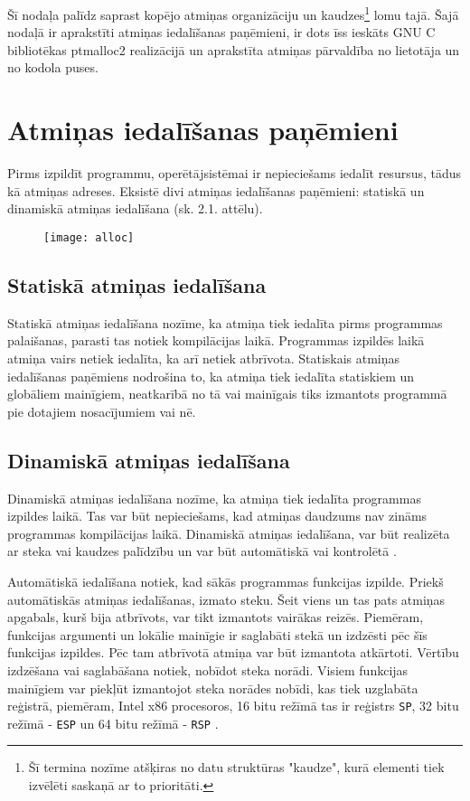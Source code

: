 ﻿Šī nodaļa palīdz saprast kopējo atmiņas organizāciju un kaudzes\footnote{Šī termina nozīme atšķiras no datu struktūras "kaudze", kurā elementi tiek izvēlēti saskaņā ar to prioritāti.} lomu tajā. 
Šajā nodaļā ir aprakstīti atmiņas iedalīšanas paņēmieni, ir dots īss ieskāts GNU C bibliotēkas ptmalloc2 realizācijā un aprakstīta atmiņas pārvaldība no lietotāja un no kodola puses.

\section{Atmiņas iedalīšanas paņēmieni}

Pirms izpildīt programmu, operētājsistēmai ir nepieciešams iedalīt resursus, tādus kā atmiņas adreses.  
Eksistē divi atmiņas iedalīšanas paņēmieni: statiskā un dinamiskā atmiņas iedalīšana (sk. 2.1. attēlu). 

\begin{figure}[h]
\begin{center}
\texttt{[image: alloc]}
\end{center}
\caption{\textbf{\fontsize{11}{12}\selectfont {Atmiņas iedalīšanas paņēmienu klasifikācija}}}
\label{fig:alloc}
\end{figure}


\subsection{Statiskā atmiņas iedalīšana}
Statiskā atmiņas iedalīšana nozīme, ka atmiņa tiek iedalīta pirms programmas palaišanas, parasti tas notiek kompilācijas laikā.
Programmas izpildēs laikā atmiņa vairs netiek iedalīta, ka arī netiek atbrīvota. 
Statiskais atmiņas iedalīšanas paņēmiens nodrošina to, ka atmiņa tiek iedalīta statiskiem un globāliem mainīgiem, neatkarībā no tā vai mainīgais tiks izmantots programmā pie dotajiem nosacījumiem vai nē.

\subsection{Dinamiskā atmiņas iedalīšana}
Dinamiskā atmiņas iedalīšana nozīme, ka atmiņa tiek iedalīta programmas izpildes laikā.
Tas var būt nepieciešams, kad atmiņas daudzums nav zināms programmas kompilācijas laikā. 
Dinamiskā atmiņas iedalīšana, var būt realizēta ar steka vai kaudzes palīdzību un var būt automātiskā vai kontrolētā \cite{SDMA}.

Automātiskā iedalīšana notiek, kad sākās programmas funkcijas izpilde. 
Priekš automātiskās atmiņas iedalīšanas, izmato steku.
Šeit viens un tas pats atmiņas apgabals, kurš bija atbrīvots, var tikt izmantots  vairākas reizēs. 
Piemēram, funkcijas argumenti un lokālie mainīgie ir saglabāti stekā un izdzēsti pēc šīs funkcijas izpildes. 
Pēc tam atbrīvotā atmiņa var būt izmantota atkārtoti. 
Vērtību izdzēšana vai saglabāšana notiek, nobīdot steka norādi.
Visiem funkcijas mainīgiem var piekļūt izmantojot steka norādes nobīdi, kas tiek uzglabāta reģistrā, piemēram,  
Intel x86 procesoros, 16 bitu režīmā tas ir reģistrs \texttt{SP}, 32 bitu režīmā - \texttt{ESP} un 64 bitu režīmā - \texttt{RSP} \cite{JCL}.


